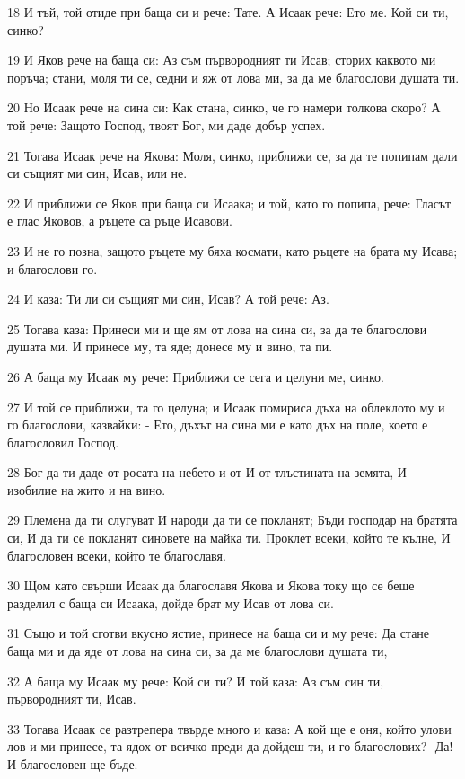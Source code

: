 \par 18 И тъй, той отиде при баща си и рече: Тате. А Исаак рече: Ето ме. Кой си ти, синко?
\par 19 И Яков рече на баща си: Аз съм първородният ти Исав; сторих каквото ми поръча; стани, моля ти се, седни и яж от лова ми, за да ме благослови душата ти.
\par 20 Но Исаак рече на сина си: Как стана, синко, че го намери толкова скоро? А той рече: Защото Господ, твоят Бог, ми даде добър успех.
\par 21 Тогава Исаак рече на Якова: Моля, синко, приближи се, за да те попипам дали си същият ми син, Исав, или не.
\par 22 И приближи се Яков при баща си Исаака; и той, като го попипа, рече: Гласът е глас Яковов, а ръцете са ръце Исавови.
\par 23 И не го позна, защото ръцете му бяха космати, като ръцете на брата му Исава; и благослови го.
\par 24 И каза: Ти ли си същият ми син, Исав? А той рече: Аз.
\par 25 Тогава каза: Принеси ми и ще ям от лова на сина си, за да те благослови душата ми. И принесе му, та яде; донесе му и вино, та пи.
\par 26 А баща му Исаак му рече: Приближи се сега и целуни ме, синко.
\par 27 И той се приближи, та го целуна; и Исаак помириса дъха на облеклото му и го благослови, казвайки: - Ето, дъхът на сина ми е като дъх на поле, което е благословил Господ.
\par 28 Бог да ти даде от росата на небето и от И от тлъстината на земята, И изобилие на жито и на вино.
\par 29 Племена да ти слугуват И народи да ти се покланят; Бъди господар на братята си, И да ти се покланят синовете на майка ти. Проклет всеки, който те кълне, И благословен всеки, който те благославя.
\par 30 Щом като свърши Исаак да благославя Якова и Якова току що се беше разделил с баща си Исаака, дойде брат му Исав от лова си.
\par 31 Също и той сготви вкусно ястие, принесе на баща си и му рече: Да стане баща ми и да яде от лова на сина си, за да ме благослови душата ти,
\par 32 А баща му Исаак му рече: Кой си ти? И той каза: Аз съм син ти, първородният ти, Исав.
\par 33 Тогава Исаак се разтрепера твърде много и каза: А кой ще е оня, който улови лов и ми принесе, та ядох от всичко преди да дойдеш ти, и го благослових?- Да! И благословен ще бъде.
